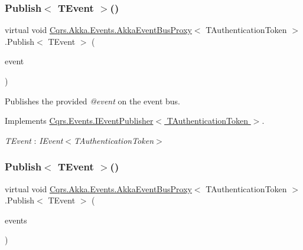 \subsubsection{\texorpdfstring{Publish$<$ T\+Event $>$()}{Publish< TEvent >()}\hspace{0.1cm}{\footnotesize\ttfamily [1/2]}}
{\footnotesize\ttfamily virtual void \hyperlink{classCqrs_1_1Akka_1_1Events_1_1AkkaEventBusProxy}{Cqrs.\+Akka.\+Events.\+Akka\+Event\+Bus\+Proxy}$<$ T\+Authentication\+Token $>$.Publish$<$ T\+Event $>$ (\begin{DoxyParamCaption}\item[{T\+Event @}]{event }\end{DoxyParamCaption})\hspace{0.3cm}{\ttfamily [virtual]}}



Publishes the provided {\itshape @event}  on the event bus. 



Implements \hyperlink{interfaceCqrs_1_1Events_1_1IEventPublisher_a02f0db0bc9b3aa1c7f766f58f8422ee3}{Cqrs.\+Events.\+I\+Event\+Publisher$<$ T\+Authentication\+Token $>$}.

\begin{Desc}
\item[Type Constraints]\begin{description}
\item[{\em T\+Event} : {\em I\+Event$<$T\+Authentication\+Token$>$}]\end{description}
\end{Desc}
\mbox{\label{classCqrs_1_1Akka_1_1Events_1_1AkkaEventBusProxy_af4c202eaab00ed2fb6160d5b114d935c}} 
\subsubsection{\texorpdfstring{Publish$<$ T\+Event $>$()}{Publish< TEvent >()}\hspace{0.1cm}{\footnotesize\ttfamily [2/2]}}
{\footnotesize\ttfamily virtual void \hyperlink{classCqrs_1_1Akka_1_1Events_1_1AkkaEventBusProxy}{Cqrs.\+Akka.\+Events.\+Akka\+Event\+Bus\+Proxy}$<$ T\+Authentication\+Token $>$.Publish$<$ T\+Event $>$ (\begin{DoxyParamCaption}\item[{I\+Enumerable$<$ T\+Event $>$}]{events }\end{DoxyParamCaption})\hspace{0.3cm}{\ttfamily [virtual]}}



